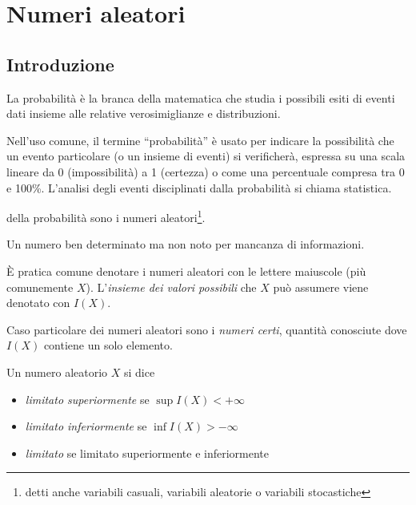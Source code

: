 %
%
%
%
\chapter{Numeri aleatori}
\section{Introduzione}
La probabilità è la branca della matematica che studia i possibili esiti di eventi dati insieme alle relative verosimiglianze e distribuzioni.

Nell'uso comune, il termine ``probabilità'' è usato per indicare la possibilità che un evento particolare (o un insieme di eventi) si verificherà, espressa su una scala lineare da 0 (impossibilità) a 1 (certezza) o come una percentuale compresa tra 0 e 100\%.
L'analisi degli eventi disciplinati dalla probabilità si chiama statistica.

 della probabilità sono i numeri aleatori\footnote{detti anche variabili casuali, variabili aleatorie o variabili stocastiche}.

\begin{definition}
  Un numero ben determinato ma non noto per mancanza di informazioni.
\end{definition}
È pratica comune denotare i numeri aleatori con le lettere maiuscole (più comunemente $X$).
L'\emph{insieme dei valori possibili} che $X$ può assumere viene denotato con $I(X)$.

Caso particolare dei numeri aleatori sono i \emph{numeri certi}, quantità conosciute dove $I(X)$ contiene un solo elemento.

\begin{definition}
  Un numero aleatorio $X$ si dice
  \begin{itemize}
  \item \emph{limitato superiormente} se \( \sup I(X) < + \infty \)
  \item \emph{limitato inferiormente} se \( \inf I(X) > - \infty \)
  \item \emph{limitato} se limitato superiormente e inferiormente
  \end{itemize}
\end{definition}

